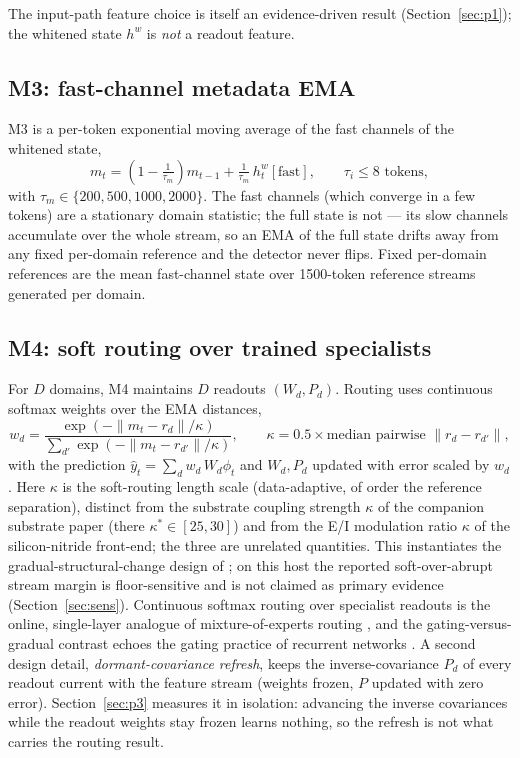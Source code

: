 \documentclass[preprint,12pt]{elsarticle}
\begin{document}
The input-path feature choice is itself an evidence-driven result
(Section~\ref{sec:p1}); the whitened state $h^w$ is \emph{not} a readout
feature.

\subsection{M3: fast-channel metadata EMA}
\label{sec:m3}

M3 is a per-token exponential moving average of the fast channels of the
whitened state,
\begin{equation}
m_t = \left(1 - \tfrac{1}{\tau_m}\right) m_{t-1} +
\tfrac{1}{\tau_m}\, h^w_t[\mathrm{fast}], \qquad \tau_i \le 8
\text{ tokens},
\label{eq:ema}
\end{equation}
with $\tau_m \in \{200,500,1000,2000\}$. The fast channels (which
converge in a few tokens) are a stationary domain statistic; the full
state is not --- its slow channels accumulate over the whole stream, so
an EMA of the full state drifts away from any fixed per-domain reference
and the detector never flips.
Fixed per-domain references are the mean fast-channel state over
1500-token reference streams generated per domain.

\subsection{M4: soft routing over trained specialists}
\label{sec:m4}

For $D$ domains, M4 maintains $D$ readouts $(W_d, P_d)$. Routing uses
continuous softmax weights over the EMA distances,
\begin{equation}
w_d = \frac{\exp(-\|m_t - r_d\|/\kappa)}{\sum_{d'}
\exp(-\|m_t - r_{d'}\|/\kappa)},
\qquad \kappa = 0.5 \times \text{median pairwise }\|r_d - r_{d'}\|,
\label{eq:soft}
\end{equation}
with the prediction $\hat{y}_t = \sum_d w_d\, W_d \phi_t$ and
$W_d, P_d$ updated with error scaled by $w_d$. Here $\kappa$ is the
soft-routing length scale (data-adaptive, of order the reference
separation), distinct from the substrate coupling strength $\kappa$ of the
companion substrate paper \cite{redema} (there $\kappa^{*}\in[25,30]$) and
from the E/I modulation ratio $\kappa$ of the silicon-nitride front-end;
the three are unrelated quantities. This instantiates the
gradual-structural-change design of \cite{redemc}; on this host the
reported soft-over-abrupt stream margin is floor-sensitive and is not
claimed as primary evidence (Section~\ref{sec:sens}).
Continuous softmax routing over specialist readouts is the online,
single-layer analogue of mixture-of-experts routing
\cite{shazeer2017moe}, and the gating-versus-gradual contrast echoes
the gating practice of recurrent networks \cite{hochreiter1997lstm}.
A second design detail, \emph{dormant-covariance refresh}, keeps the
inverse-covariance $P_d$ of every readout current with the feature stream
(weights frozen, $P$ updated with zero error). Section~\ref{sec:p3}
measures it in isolation: advancing the inverse covariances while the
readout weights stay frozen learns nothing, so the refresh is not what
carries the routing result.
\end{document}
